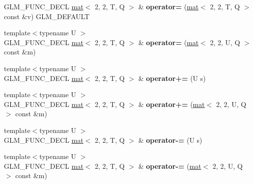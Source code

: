 \begin{DoxyCompactItemize}
\mbox{\label{structglm_1_1mat_3_012_00_012_00_01T_00_01Q_01_4_a29811e3fdcc42d6e3ac638b7f7562192}} 
G\+L\+M\+\_\+\+F\+U\+N\+C\+\_\+\+D\+E\+CL \hyperlink{structglm_1_1mat}{mat}$<$ 2, 2, T, Q $>$ \& {\bfseries operator=} (\hyperlink{structglm_1_1mat}{mat}$<$ 2, 2, T, Q $>$ const \&v) G\+L\+M\+\_\+\+D\+E\+F\+A\+U\+LT
\item 
\mbox{\label{structglm_1_1mat_3_012_00_012_00_01T_00_01Q_01_4_a540f5db7a9746de76d44d7c8312ed817}} 
{\footnotesize template$<$typename U $>$ }\\G\+L\+M\+\_\+\+F\+U\+N\+C\+\_\+\+D\+E\+CL \hyperlink{structglm_1_1mat}{mat}$<$ 2, 2, T, Q $>$ \& {\bfseries operator=} (\hyperlink{structglm_1_1mat}{mat}$<$ 2, 2, U, Q $>$ const \&m)
\item 
\mbox{\label{structglm_1_1mat_3_012_00_012_00_01T_00_01Q_01_4_acb56f312f0c6017e051b447d4bdaf2e1}} 
{\footnotesize template$<$typename U $>$ }\\G\+L\+M\+\_\+\+F\+U\+N\+C\+\_\+\+D\+E\+CL \hyperlink{structglm_1_1mat}{mat}$<$ 2, 2, T, Q $>$ \& {\bfseries operator+=} (U s)
\item 
\mbox{\label{structglm_1_1mat_3_012_00_012_00_01T_00_01Q_01_4_a790cb47974031acf26e1f76c1453da8b}} 
{\footnotesize template$<$typename U $>$ }\\G\+L\+M\+\_\+\+F\+U\+N\+C\+\_\+\+D\+E\+CL \hyperlink{structglm_1_1mat}{mat}$<$ 2, 2, T, Q $>$ \& {\bfseries operator+=} (\hyperlink{structglm_1_1mat}{mat}$<$ 2, 2, U, Q $>$ const \&m)
\item 
\mbox{\label{structglm_1_1mat_3_012_00_012_00_01T_00_01Q_01_4_aecdeb6c1dc9896a5e3245fbdf4cd55de}} 
{\footnotesize template$<$typename U $>$ }\\G\+L\+M\+\_\+\+F\+U\+N\+C\+\_\+\+D\+E\+CL \hyperlink{structglm_1_1mat}{mat}$<$ 2, 2, T, Q $>$ \& {\bfseries operator-\/=} (U s)
\item 
\mbox{\label{structglm_1_1mat_3_012_00_012_00_01T_00_01Q_01_4_af18719180a65a0bedb63d5f4714ceda4}} 
{\footnotesize template$<$typename U $>$ }\\G\+L\+M\+\_\+\+F\+U\+N\+C\+\_\+\+D\+E\+CL \hyperlink{structglm_1_1mat}{mat}$<$ 2, 2, T, Q $>$ \& {\bfseries operator-\/=} (\hyperlink{structglm_1_1mat}{mat}$<$ 2, 2, U, Q $>$ const \&m)

\end{DoxyCompactItemize}
